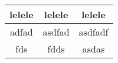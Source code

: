 \begin{tabular}{||c||c||c||}
  \hline
  lelele & lelele & lelele \\ \hline
  adfad & asdfad & asdfadf \\ \hline
  fds & fdds & asdas \\ \hline
  \hline
\end{tabular}
